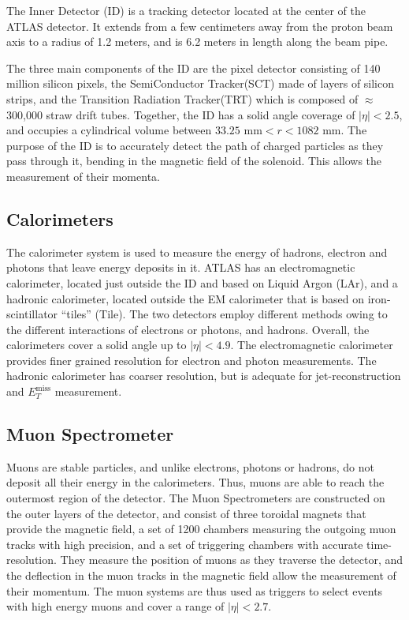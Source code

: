 \documentclass[12pt,a4paper,openright,twoside]{report}
\newcommand{\met}{$E_T^{\mathrm{miss}}$ }
\begin{document}
The Inner Detector (ID) \cite{inner_detector} is a tracking detector located at the center of the ATLAS detector. It extends from a few centimeters away from the proton beam axis to a radius of 1.2 meters, and is 6.2 meters in length along the beam pipe.

The three main components of the ID are the pixel detector consisting of 140 million silicon pixels, the SemiConductor Tracker(SCT) made of layers of silicon strips, and the Transition Radiation Tracker(TRT) which is composed of $\approx$300,000 straw drift tubes. Together, the ID has a solid angle coverage of $|\eta|<2.5$, and occupies a cylindrical volume between $33.25\text{ mm} < r<1082\text{ mm}$. The purpose of the ID is to accurately detect the path of charged particles as they pass through it, bending in the magnetic field of the solenoid. This allows the measurement of their momenta.

\subsection{Calorimeters}
The calorimeter system is used to measure the energy of hadrons, electron and photons that leave energy deposits in it. ATLAS has an electromagnetic calorimeter, located just outside the ID and based on Liquid Argon (LAr), and a hadronic calorimeter, located outside the EM calorimeter that is based on iron-scintillator ``tiles'' (Tile). The two detectors employ different methods owing to the different interactions of electrons or photons, and hadrons. Overall, the calorimeters cover a solid angle up to $|\eta|<4.9$. The electromagnetic calorimeter provides finer grained resolution for electron and photon measurements. The hadronic calorimeter has coarser resolution, but is adequate for jet-reconstruction and \met measurement.

\subsection{Muon Spectrometer}
Muons are stable particles, and unlike electrons, photons or hadrons, do not deposit all their energy in the calorimeters. Thus, muons are able to reach the outermost region of the detector. The Muon Spectrometers are constructed on the outer layers of the detector, and consist of three toroidal magnets that provide the magnetic field, a set of 1200 chambers measuring the outgoing muon tracks with high precision, and a set of triggering chambers with accurate time-resolution. They measure the position of muons as they traverse the detector, and the deflection in the muon tracks in the magnetic field allow the measurement of their momentum. The muon systems are thus used as triggers to select events with high energy muons and cover a range of $|\eta|<2.7$. 
\end{document}
